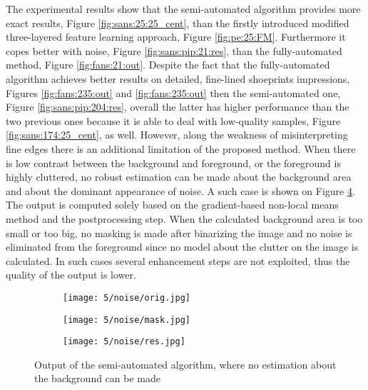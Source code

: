 \documentclass[draft,final]{vutinfth} %
\begin{document}
\par
The experimental results show that the semi-automated algorithm provides more exact results, Figure \ref{fig:sans:25:25_cent}, than the firstly introduced modified three-layered feature learning approach, Figure \ref{fig:pe:25:FM}.
Furthermore it copes better with noise, Figure \ref{fig:sans:pip:21:res}, than the fully-automated method, Figure \ref{fig:fans:21:out}.
Despite the fact that the fully-automated algorithm achieves better results on detailed, fine-lined shoeprints impressions, Figures \ref{fig:fans:235:out} and \ref{fig:fans:235:out} then the semi-automated one, Figure \ref{fig:sans:pip:204:res}, overall the latter has higher performance than the two previous ones because it is able to deal with low-quality samples, Figure \ref{fig:sans:174:25_cent}, as well.
However, along the weakness of misinterpreting fine edges there is an additional limitation of the proposed method.
When there is low contrast between the background and foreground, or the foreground is highly cluttered, no robust estimation can be made about the background area and about the dominant appearance of noise.
A such case is shown on Figure \ref{fig:sans:noise}.
The output is computed solely based on the gradient-based non-local means method and the postprocessing step.
When the calculated background area is too small or too big, no masking is made after binarizing the image and no noise is eliminated from the foreground since no model about the clutter on the image is calculated.
In such cases several enhancement steps are not exploited, thus the quality of the output is lower.

\begin{figure}[h]
  \centering
  \begin{subfigure}[t]{0.3\columnwidth}
    \centering
    \texttt{[image: 5/noise/orig.jpg]}
    \label{fig:sans:noise:orig}
  \end{subfigure}
  \begin{subfigure}[t]{0.3\columnwidth}
    \centering
    \texttt{[image: 5/noise/mask.jpg]}
    \label{fig:sans:noise:mask}
  \end{subfigure}
  \begin{subfigure}[t]{0.3\columnwidth}
    \centering
   \texttt{[image: 5/noise/res.jpg]}
    \label{fig:sans:noise:res}
  \end{subfigure}
 
  \caption{Output of the semi-automated algorithm, where no estimation about the background can be made}
  \label{fig:sans:noise}
\end{figure}
\end{document}
